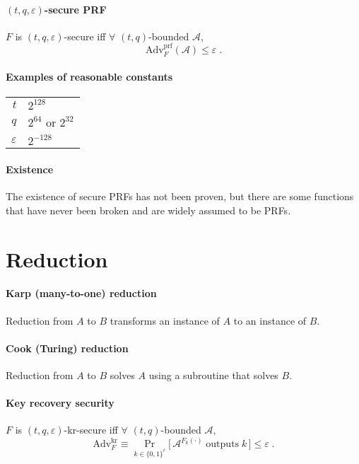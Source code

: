 \documentclass[11pt]{article}
\newcommand{\eqdef}{\ensuremath{\equiv}}
\newcommand{\eps}{\ensuremath{\varepsilon}}
\theoremstyle{remark}
\begin{document}
\paragraph{$(t,q,\eps)$-secure PRF}
$F$ is $(t,q,\eps)$-secure iff
$\forall$ $(t,q)$-bounded $\mathcal{A}$,
\[ \textrm{Adv}_F^\textrm{prf}(\mathcal{A}) \le \eps \;\textrm{.} \]

\paragraph{Examples of reasonable constants}
\begin{tabular}{r|l}
$t$ & $2^{128}$ \\
$q$ & $2^{64}$ or $2^{32}$ \\
$\eps$ & $2^{-128}$
\end{tabular}

\paragraph{Existence}
The existence of secure PRFs has not been proven,
but there are some functions that have never been
broken and are widely assumed to be PRFs.

\section{Reduction}

\paragraph{Karp (many-to-one) reduction}
Reduction from $A$ to $B$ transforms
an instance of $A$ to an instance of $B$.

\paragraph{Cook (Turing) reduction}
Reduction from $A$ to $B$ solves $A$
using a subroutine that solves $B$.

\paragraph{Key recovery security}
$F$ is $(t,q,\eps)$-kr-secure
iff $\forall$ $(t,q)$-bounded $\mathcal{A}$,
\[ \textrm{Adv}_F^\textrm{kr} \eqdef
\Pr_{k \in \{0,1\}^\ell} \big[\,
  \mathcal{A}^{F_k(\cdot)}\;\textrm{outputs}\;k
\,\big] \le \eps \;\textrm{.} \]
\end{document}
